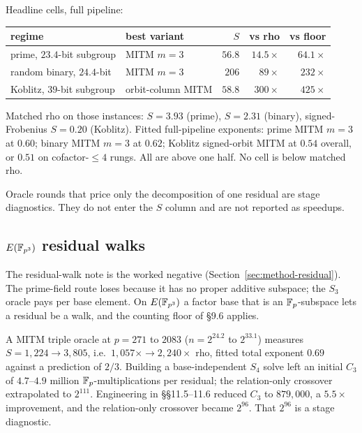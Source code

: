 Headline cells, full pipeline:

\begin{center}
\small
\begin{tabular}{@{}llrrr@{}}
\toprule
regime & best variant & $S$ & vs rho & vs floor \\
\midrule
prime, $23.4$-bit subgroup & MITM $m=3$ & $56.8$ & $14.5\times$ & $64.1\times$ \\
random binary, $24.4$-bit & MITM $m=3$ & $206$ & $89\times$ & $232\times$ \\
Koblitz, $39$-bit subgroup & orbit-column MITM & $58.8$ & $300\times$ & $425\times$ \\
\bottomrule
\end{tabular}
\end{center}

Matched rho on those instances: $S=3.93$ (prime), $S=2.31$ (binary),
signed-Frobenius $S=0.20$ (Koblitz). Fitted full-pipeline exponents:
prime MITM $m=3$ at $0.60$; binary MITM $m=3$ at $0.62$; Koblitz
signed-orbit MITM at $0.54$ overall, or $0.51$ on cofactor-${}\le 4$
rungs. All are above one half. No cell is below matched rho.

Oracle rounds that price only the decomposition of one residual are
stage diagnostics. They do not enter the $S$ column and are not
reported as speedups.

\subsection{\texorpdfstring{$E(\mathbb{F}_{p^3})$ residual walks}{E(F_p^3) residual walks}}
\label{sec:ic-cubic}

The residual-walk note is the worked negative
(Section~\ref{sec:method-residual}). The prime-field route loses
because it has no proper additive subspace; the $S_3$ oracle pays per
base element. On $E(\mathbb{F}_{p^3})$ a factor base that is an
$\mathbb{F}_p$-subspace lets a residual be a walk, and the counting floor of
§9.6 applies.

A MITM triple oracle at $p=271$ to $2083$ ($n=2^{24.2}$ to $2^{33.1}$)
measures $S=1{,}224\to 3{,}805$, i.e.\ $1{,}057\times\to 2{,}240\times$
rho, fitted total exponent $0.69$ against a prediction of $2/3$.
Building a base-independent $S_4$ solve left an initial $C_3$ of
$4.7$--$4.9$ million $\mathbb{F}_p$-multiplications per residual; the
relation-only crossover extrapolated to $2^{111}$. Engineering in
§§11.5--11.6 reduced $C_3$ to $879{,}000$, a $5.5\times$ improvement,
and the relation-only crossover became $2^{96}$. That $2^{96}$ is a
stage diagnostic.

